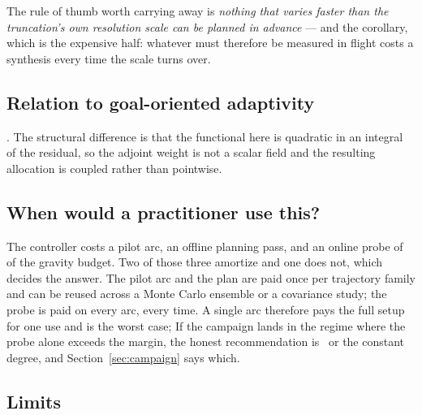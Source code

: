The rule of thumb worth carrying away is
\emph{nothing that varies faster than the truncation's own resolution scale can
be planned in advance} --- and the corollary, which is the expensive half:
whatever must therefore be measured in flight costs a synthesis every time the
scale turns over.

\subsection{Relation to goal-oriented adaptivity}

 \citep{becker2001optimal}. The structural difference is that
the functional here is quadratic in an integral of the residual, so the
adjoint weight is not a scalar field and the resulting allocation is coupled
rather than pointwise.

\subsection{When would a practitioner use this?}

 The controller costs a pilot arc, an offline planning pass,
and an online probe of  of the gravity budget. Two of those three
amortize and one does not, which decides the answer. The pilot arc and the plan
are paid once per trajectory family and can be reused across a Monte Carlo
ensemble or a covariance study; the probe is paid on every arc, every time.
A single arc therefore pays the full setup for one use and is the worst case;
 If the campaign lands in the regime where
the probe alone exceeds the margin, the honest recommendation is \Clite\ or the
constant degree, and Section~\ref{sec:campaign} says which.

\subsection{Limits}

